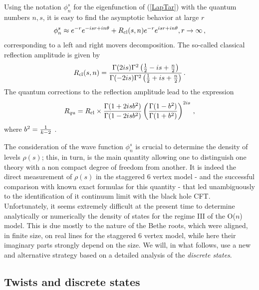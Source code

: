 \documentclass[11pt]{article}
\begin{document}
Using  the notation $\phi_n^s$ for the eigenfunction of (\ref{LapTar}) with the quantum numbers $n,s$, it is easy to find the asymptotic behavior
at large $r$ 
%
\begin{equation}
 \phi_n^s\approx e^{-r}e^{-isr+in\theta}+R_{\rm cl}(s,n)e^{-r}e^{isr+in\theta},r\to\infty  \,,  \label{asympWF}
\end{equation}
% 
corresponding to a left and right movers decomposition. The so-called classical reflection amplitude is given by 
%
\begin{equation}
 R_{\rm cl}(s,n)={\Gamma(2is)\Gamma^2\left({1\over 2}-is+{n\over 2}\right)\over \Gamma(-2is)\Gamma^2\left({1\over 2}+is+{n\over 2}\right)} \,.
\end{equation}
%
The quantum corrections to the reflection amplitude lead to the expression
%
\begin{equation}
R_{qu}=R_{\rm cl}\times{\Gamma(1+2isb^2)\over \Gamma(1-2isb^2)}\left({\Gamma(1-b^2)\over \Gamma(1+b^2)}\right)^{2is} \,,
\end{equation} 
%
where $b^2={1\over k-2}$ \cite{BlackHoleCFT,RibSch}.
 
The consideration of the wave function $\phi_n^s$ is crucial to determine the density of levels $\rho(s)$; this, in turn, is the main quantity allowing one to distinguish one theory with a non compact degree of freedom from another. It is  indeed the direct measurement of $\rho(s)$ in the staggered 6 vertex model - and the successful comparison with known exact formulas for this quantity \cite{Troost} - that led unambiguously to the identification of it continuum limit with the black hole CFT.  Unfortunately, it seems extremely difficult at the present time  to determine analytically or numerically the density of states for the regime III of the O($n$) model. This is due mostly to  the nature of the Bethe roots, which were aligned, in finite size, on real lines for the staggered 6 vertex model, while here their imaginary parts strongly depend on the size. We will, in what follows, use a new and  alternative strategy based on a detailed analysis of the {\sl discrete states}. 

\subsection{Twists and discrete states}
\label{sec:twist}
\end{document}

